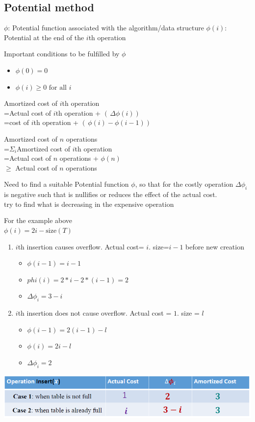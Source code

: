 \documentclass{article}
\begin{document}
\begin{multicols*}{4}
\subsection{Potential method}
$\phi$: Potential function associated with the algorithm/data structure
$\phi(i)$: Potential at the end of the $i$th operation

Important conditions to be fulfilled by $\phi$
\begin{itemize}
	\item $\phi(0)=0$
	\item $\phi(i)\geq 0 \text{ for all } i$
\end{itemize}

Amortized cost of $i$th operation\\
=Actual cost of $i$th operation + $( \, \Delta \phi(i))\,$\\
=cost of $i$th operation + $( \,\phi(i)-\phi(i-1))\,$

\vspace{5mm} %
Amortized cost of $n$ operations\\
=$\Sigma_i$Amortized cost of $i$th operation\\
=Actual cost of $n$ operations + $\phi(n)$\\
$\geq$ Actual cost of $n$ operations

Need to find a suitable Potential function $\phi$, so that for the costly operation $\Delta \phi_i$ is negative such that is nullifies or reduces the effect of the actual cost.\\
try to find what is decreasing in the expensive operation

\newpage
For the example above\\
$\phi(i)=2i-\text{size}(T)$
\begin{enumerate}
	\item $i$th insertion causes overflow. Actual cost= $i$. size=$i-1$ before new creation
		\begin{itemize}
			\item $\phi(i-1)=i-1$
			\item $phi(i)=2*i-2*(i-1)=2$
			\item $\Delta \phi_i=3-i$
		\end{itemize}
	\item $i$th insertion does not cause overflow. Actual cost = $1$. size = $l$
		\begin{itemize}
			\item $\phi(i-1)=2(i-1)-l$
			\item $\phi(i)=2i-l$
			\item $\Delta \phi_i=2$
		\end{itemize}
\end{enumerate}
\includegraphics[width=\linewidth]{./images/potential.png}
 

\end{multicols*}
\end{document}
